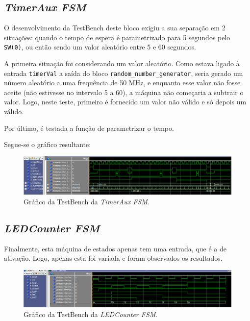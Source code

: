 \documentclass[a4paper,11pt,onecolumn]{report}
\begin{document}
\subsection{\textit{TimerAux FSM}}

O desenvolvimento da TestBench deste bloco exigiu a sua separação em 2 situações: quando o tempo de espera é parametrizado para 5 segundos pelo \texttt{SW(0)}, ou então sendo um valor aleatório entre 5 e 60 segundos.

A primeira situação foi considerando um valor aleatório. Como estava ligado à entrada \texttt{timerVal} a saída do bloco \texttt{random\_number\_generator}, seria gerado um número aleatório a uma frequência de 50 MHz, e enquanto esse valor não fosse aceite (não estivesse no intervalo 5 a 60), a máquina não começaria a subtrair o valor. Logo, neste teste, primeiro é fornecido um valor não válido e só depois um válido.

Por último, é testada a função de parametrizar o tempo.

Segue-se o gráfico resultante:

\begin{figure}[h]
\centerline{\includegraphics[scale=0.33]{Images/TimerAuxFSMTB}}
\caption{Gráfico da TestBench da \textit{TimerAux FSM}.}
\label{figtimerfsmtb}
\end{figure}

\subsection{\textit{LEDCounter FSM}}

Finalmente, esta máquina de estados apenas tem uma entrada, que é a de ativação. Logo, apenas esta foi variada e foram observados os resultados.

\begin{figure}[h]
\centerline{\includegraphics[scale=0.33]{Images/LEDCounterFSMTB}}
\caption{Gráfico da TestBench da \textit{LEDCounter FSM}.}
\label{figledcounterfsmtb}
\end{figure}
\end{document}
